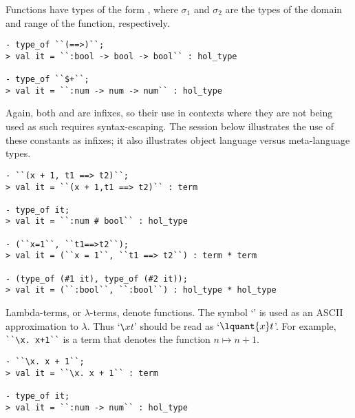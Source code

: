 Functions have types of the form , where $\sigma_1$ and $\sigma_2$ are the types of the domain and range of the function, respectively.

\begin{session}
\begin{verbatim}
- type_of ``(==>)``;
> val it = ``:bool -> bool -> bool`` : hol_type

- type_of ``$+``;
> val it = ``:num -> num -> num`` : hol_type
\end{verbatim}
\end{session}

\noindent Again, both \holtxt{+} and \holtxt{==>} are infixes, so their use in contexts where they are not being used as such requires syntax-escaping.
The session below illustrates the use of these constants as infixes; it also illustrates object language versus meta-language types.

\begin{session}
\begin{verbatim}
- ``(x + 1, t1 ==> t2)``;
> val it = ``(x + 1,t1 ==> t2)`` : term

- type_of it;
> val it = ``:num # bool`` : hol_type

- (``x=1``, ``t1==>t2``);
> val it = (``x = 1``, ``t1 ==> t2``) : term * term

- (type_of (#1 it), type_of (#2 it));
> val it = (``:bool``, ``:bool``) : hol_type * hol_type
\end{verbatim}
\end{session}

Lambda-terms, or $\lambda$-terms, denote functions.
The symbol `\holtxt{\bs}' is used as an ASCII approximation to $\lambda$.
Thus `{\small\verb|\|}$x$$t$' should be read as `$\lquant{x}t$'.
For example, {\small\verb|``\x. x+1``|} is a term that denotes the function $n\mapsto n{+}1$.

\begin{session}
\begin{verbatim}
- ``\x. x + 1``;
> val it = ``\x. x + 1`` : term

- type_of it;
> val it = ``:num -> num`` : hol_type
\end{verbatim}
\end{session}

